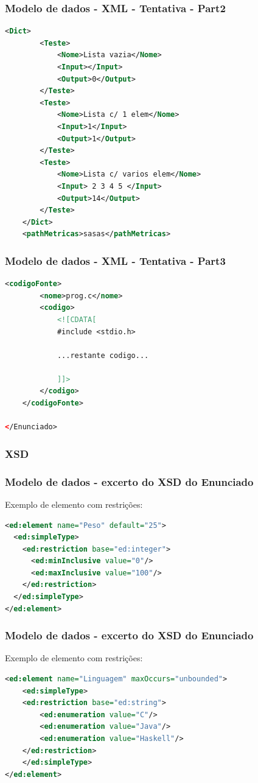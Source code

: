 \documentclass{beamer}
\begin{document}
\begin{frame}[fragile] \frametitle{Modelo de dados - XML - Tentativa - Part2}
\begin{lstlisting}[language=XML,basicstyle=\tiny,breaklines=true]
    <Dict>
        <Teste>
            <Nome>Lista vazia</Nome>
            <Input></Input>
            <Output>0</Output>
        </Teste>
        <Teste>
            <Nome>Lista c/ 1 elem</Nome>
            <Input>1</Input>
            <Output>1</Output>
        </Teste>
        <Teste>
            <Nome>Lista c/ varios elem</Nome>
            <Input> 2 3 4 5 </Input>
            <Output>14</Output>
        </Teste>
    </Dict>
    <pathMetricas>sasas</pathMetricas>
\end{lstlisting}
\end{frame}

\begin{frame}[fragile] \frametitle{Modelo de dados - XML - Tentativa - Part3}
\begin{lstlisting}[language=XML,basicstyle=\tiny,breaklines=true]
    <codigoFonte>
        <nome>prog.c</nome>
        <codigo>
            <![CDATA[
            #include <stdio.h>
            
            ...restante codigo...
            
            ]]>
        </codigo>
    </codigoFonte>
        
</Enunciado>
\end{lstlisting}
\end{frame}

\subsubsection{XSD}
\begin{frame}[fragile] \frametitle{Modelo de dados - excerto do XSD do Enunciado}
Exemplo de elemento com restrições:\\
\begin{lstlisting}[language=XML,basicstyle=\tiny,breaklines=true]
<ed:element name="Peso" default="25">
  <ed:simpleType>
    <ed:restriction base="ed:integer">
      <ed:minInclusive value="0"/>
      <ed:maxInclusive value="100"/>
    </ed:restriction>
  </ed:simpleType>
</ed:element>
\end{lstlisting}
\end{frame}

\begin{frame}[fragile] \frametitle{Modelo de dados - excerto do XSD do Enunciado}
Exemplo de elemento com restrições:\\
\begin{lstlisting}[language=XML,basicstyle=\tiny,breaklines=true]
<ed:element name="Linguagem" maxOccurs="unbounded">
    <ed:simpleType>
    <ed:restriction base="ed:string">
        <ed:enumeration value="C"/>
        <ed:enumeration value="Java"/>
        <ed:enumeration value="Haskell"/>
    </ed:restriction>
    </ed:simpleType>
</ed:element>
\end{lstlisting}
\end{frame}
\end{document}
